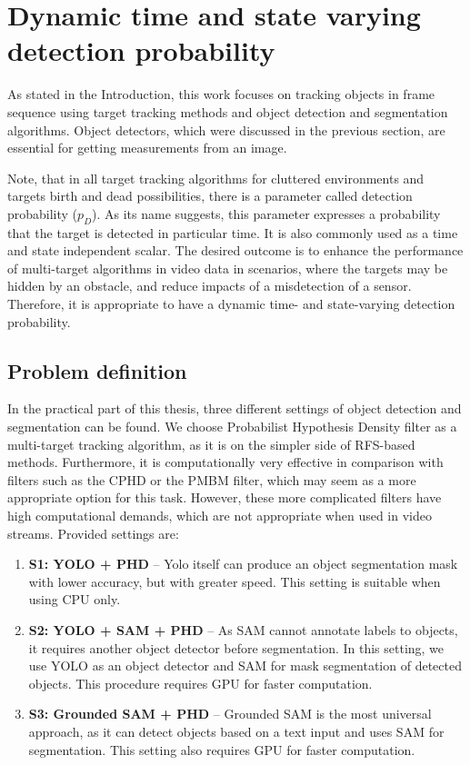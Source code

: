 \chapter{Dynamic time and state varying detection probability}
As stated in the Introduction, this work focuses on tracking objects in frame sequence using target tracking methods
and
object detection
and
segmentation algorithms. Object detectors, which were discussed in the previous section, are essential for getting
measurements
from an image.

Note, that in all target tracking algorithms for cluttered environments and targets
birth and dead possibilities, there is a parameter called detection probability ($p_D$). As its name
suggests, this parameter expresses a probability that the target is detected in particular time. It is also commonly
used
as a
time and state independent scalar. The desired outcome is to enhance the performance of multi-target
algorithms
in video data
in scenarios, where the targets may be hidden by an obstacle, and reduce impacts of a misdetection of a sensor.
Therefore, it
is appropriate to have a dynamic time- and state-varying detection probability.
\section{Problem definition}
\label{sec:mphd_problemDef}
In the practical part of this thesis, three different settings of object detection and segmentation can be found.
We choose Probabilist Hypothesis Density filter as a multi-target tracking algorithm, as it is on the simpler side of
RFS-based methods. Furthermore, it is computationally very effective in comparison with filters such as the CPHD or the
PMBM filter,
which may seem as a more appropriate option for this task. However, these more complicated filters have high
computational demands, which
are not appropriate when used in video streams. Provided settings are:
\begin{enumerate}
  \item \textbf{S1: YOLO + PHD} -- Yolo itself can produce an object segmentation mask with lower accuracy, but with
  greater
  speed. This setting is suitable when using CPU only.
  \item \textbf{S2: YOLO + SAM + PHD} -- As SAM cannot annotate labels to objects, it requires another object detector
  before segmentation. In this setting, we use YOLO as an object detector and SAM for mask segmentation of detected
  objects. This procedure requires GPU for faster computation.
  \item \textbf{S3: Grounded SAM + PHD} -- Grounded SAM is the most universal approach, as it can detect objects based
  on a text input and uses SAM for segmentation. This setting also requires GPU for faster computation.
\end{enumerate}


